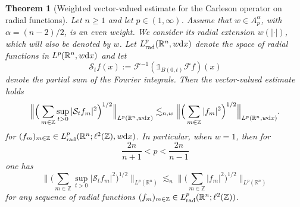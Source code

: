 \documentclass[11pt,oneside]{amsart}
\numberwithin{equation}{section}
\newtheorem{theorem}[equation]{Theorem}
\theoremstyle{definition}
\newcommand{\RR}{\mathbb{R}}
\newcommand{\ZZ}{\mathbb{Z}}
\newcommand{\calF}{\mathcal{F}}
\newcommand{\calS}{\mathcal{S}}
\begin{document}
\begin{theorem}[Weighted vector-valued estimate for the Carleson operator on radial functions]\label{thm:carlesonvectorradial}
Let \( n \geq 1 \) and let \( p \in (1, \infty) \). Assume that \( w \in A_p^\alpha \), with \( \alpha = (n - 2)/2 \), is an even weight. We consider its radial extension \( w(|\cdot|) \), which will also be denoted by \( w \). Let $L_{\rm rad}^p(\RR^n,w{\rm d}x)$ denote the space of radial functions in $L^p(\RR^n,w{\rm d}x)$ and let
\begin{equation*}
    \calS_t f(x):=\calF^{-1}(\mathds{1}_{B(0,t)}\calF f)(x)
\end{equation*}
denote the partial sum of the Fourier integrals. Then the vector-valued estimate holds
\begin{equation}\label{eq:hankelsumtoprove}
    \Big\|\Big(\sum_{m\in\ZZ}\sup_{t>0} |\calS_t f_m|^2\Big)^{1/2}\Big\|_{L^p(\RR^n,w{\rm d}x)}\lesssim_{n,w}\Big\|\Big(\sum_{m\in\ZZ}|f_m|^2\Big)^{1/2}\Big\|_{L^p(\RR^n,w{\rm d}x)}.
\end{equation}
for $(f_m)_{m\in\ZZ}\in L_{\rm rad}^p(\RR^n;\ell^2(\ZZ),w{\rm d}x)$. In particular, when $w=1$, then for
\begin{equation*}
    \frac{2n}{n+1}<p<\frac{2n}{n-1}
\end{equation*}
one has
\begin{equation*}
    \Big\|\Big(\sum_{m\in\ZZ}\sup_{t>0} |\calS_t f_m|^2\Big)^{1/2}\Big\|_{L^p(\RR^n)}\lesssim_{n}\Big\|\Big(\sum_{m\in\ZZ}|f_m|^2\Big)^{1/2}\Big\|_{L^p(\RR^n)}
\end{equation*}
for any sequence of radial functions $(f_m)_{m\in\ZZ}\in L_{\rm rad}^p(\RR^n;\ell^2(\ZZ))$.
\end{theorem}
\end{document}
